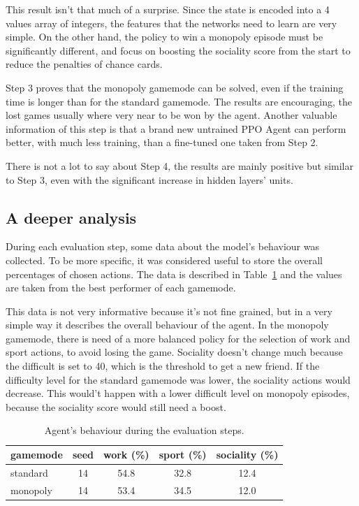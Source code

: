 \documentclass{article}
\begin{document}
This result isn't that much of a surprise. Since the state is encoded into a 4 values array of integers, the features that the networks need to learn are very simple. 
On the other hand, the policy to win a monopoly episode must be significantly different, and focus on boosting the sociality score from the start to reduce the penalties of chance cards.

Step 3 proves that the monopoly gamemode can be solved, even if the training time is longer than for the standard gamemode. The results are encouraging, the lost games usually where very near to be won by the agent. Another valuable information of this step is that a brand new untrained PPO Agent can perform better, with much less training, than a fine-tuned one taken from Step 2.

There is not a lot to say about Step 4, the results are mainly positive but similar to Step 3, even with the significant increase in hidden layers' units.


\subsection{A deeper analysis}

During each evaluation step, some data about the model's behaviour was collected. To be more specific, it was considered useful to store the overall percentages of chosen actions. The data is described in Table~\ref{behaviour} and the values are taken from the best performer of each gamemode.

This data is not very informative because it's not fine grained, but in a very simple way it describes the overall behaviour of the agent. In the monopoly gamemode, there is need of a more balanced policy for the selection of work and sport actions, to avoid losing the game. Sociality doesn't change much because the difficult is set to 40, which is the threshold to get a new friend. If the difficulty level for the standard gamemode was lower, the sociality actions would decrease. This would't happen with a lower difficult level on monopoly episodes, because the sociality score would still need a boost.

\begin{table}
  \caption{Agent's behaviour during the evaluation steps.}
  \label{behaviour}
  \centering
  \begin{tabular}{lcccc}
    \toprule
    gamemode & seed & work (\%) & sport (\%) & sociality (\%) \\
    \midrule
    standard & 14 & 54.8  & 32.8    & 12.4  \\
    monopoly & 14 & 53.4  & 34.5    & 12.0  \\
    \bottomrule
  \end{tabular}
\end{table}
\end{document}
